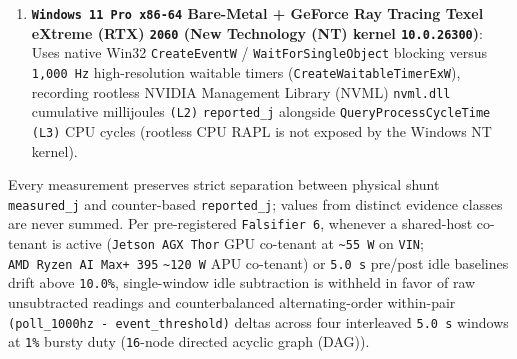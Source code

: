 \documentclass[10pt,letterpaper]{article}
\begin{document}
\begin{enumerate}
  per-process identifier (PID) \texttt{reported\_\allowbreak{}j} with \texttt{kqueue}
  + Portable Operating System Interface (POSIX) \texttt{pipe} kernel
  event blocking.
\item
  \textbf{\texttt{Windows\ 11\ Pro\ x86-\allowbreak{}64} Bare-Metal + GeForce Ray
  Tracing Texel eXtreme (RTX) \texttt{2060} (New Technology (NT) kernel
  \texttt{10.\allowbreak{}0.\allowbreak{}26300})}: Uses native Win32 \texttt{CreateEventW} /
  \texttt{WaitForSingleObject} blocking versus \texttt{1,000\ Hz}
  high-resolution waitable timers (\texttt{CreateWaitableTimerExW}),
  recording rootless NVIDIA Management Library (NVML) \texttt{nvml.dll}
  cumulative millijoules \texttt{(L2)} \texttt{reported\_\allowbreak{}j} alongside
  \texttt{QueryProcessCycleTime} \texttt{(L3)} CPU cycles (rootless CPU
  RAPL is not exposed by the Windows NT kernel).
\end{enumerate}

Every measurement preserves strict separation between physical shunt
\texttt{measured\_\allowbreak{}j} and counter-based \texttt{reported\_\allowbreak{}j}; values from
distinct evidence classes are never summed. Per pre-registered
\texttt{Falsifier\ 6}, whenever a shared-host co-tenant is active
(\texttt{Jetson\ AGX\ Thor} GPU co-tenant at
\texttt{\textasciitilde{}55\ W} on \texttt{VIN};
\texttt{AMD\ Ryzen\ AI\ Max+\ 395} \texttt{\textasciitilde{}120\ W} APU
co-tenant) or \texttt{5.0\ s} pre/post idle baselines drift above
\texttt{10.0\%}, single-window idle subtraction is withheld in favor of
raw unsubtracted readings and counterbalanced alternating-order
within-pair \texttt{(\allowbreak{}poll\_\allowbreak{}1000hz\ -\allowbreak{}\ event\_\allowbreak{}threshold)} deltas across
four interleaved \texttt{5.0\ s} windows at \texttt{1\%} bursty duty
(\texttt{16}-node directed acyclic graph (DAG)).
\end{document}

